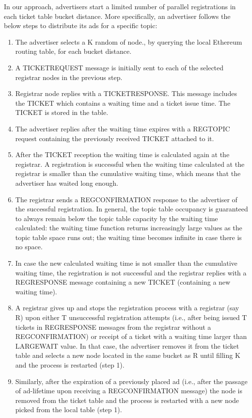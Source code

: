 In our approach,  advertisers start a limited number of parallel registrations in each ticket table bucket distance.
 More specifically, an advertiser follows the below steps to distribute its ads for a specific topic:
\begin{enumerate}
    \item The advertiser selects a K random of node.,  by querying the local Ethereum routing table,  for each bucket distance.
    \item A TICKETREQUEST message is initially sent to each of the selected registrar nodes in the previous step.
    \item Registrar node replies with a TICKETRESPONSE.  This message includes the TICKET which contains a waiting time and a ticket issue time.  The TICKET is stored in the table.
    \item The advertiser replies after the waiting time expires with a REGTOPIC request containing the previously received TICKET attached to it.
    \item After the TICKET reception the waiting time is calculated again at the registrar.  A registration is successful when the waiting time calculated at the registrar is smaller than the cumulative waiting time,  which means that the advertiser has waited long enough.
    \item The registrar sends a REGCONFIRMATION response to the advertiser of the successful registration. In general, the topic table occupancy is guaranteed to always remain below the topic table capacity by the waiting time calculated: the waiting time function returns increasingly large values as the topic table space runs out; the waiting time becomes infinite in case there is no space.
    \item In case the new calculated waiting time is not smaller than the cumulative waiting time, the registration is not successful and the registrar replies with a REGRESPONSE message containing a new TICKET (containing a new waiting time).
    \item A registrar gives up and stops the registration process with a registrar (say R) upon either T unsuccessful registration attempts (i.e., after being issued T tickets in REGRESPONSE messages from the registrar without a REGCONFIRMATION) or receipt of a ticket with a waiting time larger than LARGEWAIT value.  In that case,  the advertiser removes it from the ticket table and selects a new node located in the same bucket as R until filling K and the process is restarted (step 1).
    \item Similarly,  after the expiration of a previously placed ad (i.e., after the passage of ad-lifetime upon receiving a REGCONFIRMATION message) the node is removed from the ticket table and the process is restarted with a new node picked from the local table (step 1).
\end{enumerate}